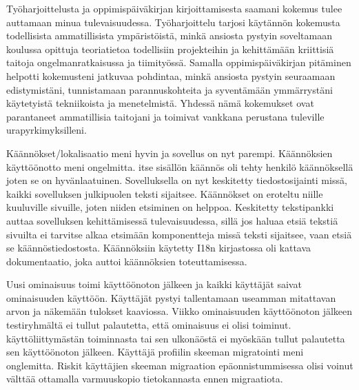 \documentclass[11pt,a4paper,titlepage,oneside]{article}
\begin{document}
\medskip




%
Työharjoittelusta ja oppimispäiväkirjan kirjoittamisesta saamani kokemus tulee auttamaan minua tulevaisuudessa.
Työharjoittelu tarjosi käytännön kokemusta todellisista ammatillisista ympäristöistä,
minkä ansiosta pystyin soveltamaan koulussa opittuja teoriatietoa todellisiin projekteihin ja kehittämään kriittisiä taitoja 
ongelmanratkaisussa ja tiimityössä.
Samalla oppimispäiväkirjan pitäminen helpotti kokemusteni jatkuvaa pohdintaa,
minkä ansiosta pystyin seuraamaan edistymistäni,
tunnistamaan parannuskohteita ja syventämään ymmärrystäni käytetyistä tekniikoista ja menetelmistä.
Yhdessä nämä kokemukset ovat parantaneet ammatillisia taitojani ja toimivat vankkana perustana tuleville urapyrkimyksilleni.
\medskip













\iffalse

Käännökset/lokalisaatio meni hyvin ja sovellus on nyt parempi.
Käännöksien käyttöönotto meni ongelmitta.
itse sisällön käännös oli tehty henkilö käännöksellä joten se on hyvänlaatuinen.
%
Sovelluksella on nyt keskitetty tiedostosijainti missä, kaikki sovelluksen julkipuolen teksti sijaitsee.
Käännökset on eroteltu niille kuuluville sivuille, joten niiden etsiminen on helppoa.
Keskitetty tekstipankki auttaa sovelluksen kehittämisessä tulevaisuudessa,
sillä jos haluaa etsiä tekstiä sivuilta ei tarvitse alkaa etsimään komponentteja missä teksti sijaitsee,
vaan etsiä se käännöstiedostosta.
%
Käännöksiin käytetty I18n kirjastossa oli kattava dokumentaatio, joka auttoi käännöksien toteuttamisessa.
\medskip



Uusi ominaisuus toimi käyttöönoton jälkeen ja kaikki käyttäjät saivat ominaisuuden käyttöön.
Käyttäjät pystyi tallentamaan useamman mitattavan arvon ja näkemään tulokset kaaviossa. %
Viikko ominaisuuden käyttöönoton jälkeen testiryhmältä ei tullut palautetta, että ominaisuus ei olisi toiminut.
%
käyttöliittymästän toiminnasta tai sen ulkonäöstä ei myöskään tullut palautetta sen käyttöönoton jälkeen.
%
Käyttäjä profiilin skeeman migratointi meni onglemitta.
Riskit käyttäjien skeeman migraation epäonnistummisessa olisi voinut välttää ottamalla varmuuskopio tietokannasta ennen migraatiota.
\medskip
\end{document}
